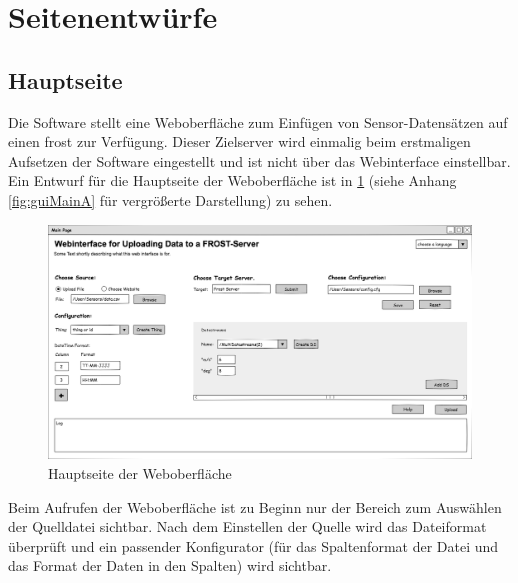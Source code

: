\documentclass[a4paper, 12 pt]{article}
\begin{document}
\section{Seitenentwürfe}

\subsection{Hauptseite}
Die Software stellt eine Weboberfläche zum Einfügen von Sensor-Datensätzen auf einen \gls{frost} zur Verfügung. 
Dieser Zielserver wird einmalig beim erstmaligen Aufsetzen der Software eingestellt und ist nicht über das Webinterface einstellbar. 
Ein Entwurf für die Hauptseite der Weboberfläche ist in \cref{fig:guiMain} (siehe Anhang \cref{fig:guiMainA} für vergrößerte Darstellung) zu sehen.
\\

\begin{figure}[htbp]
\centering
\includegraphics[scale=0.4]{images/gui}
\caption{\label{fig:guiMain}Hauptseite der Weboberfläche}
\end{figure}
Beim Aufrufen der Weboberfläche ist zu Beginn nur der Bereich zum Auswählen der Quelldatei sichtbar. 
Nach dem Einstellen der Quelle wird das Dateiformat überprüft und ein passender Konfigurator (für das Spaltenformat der Datei und das Format der Daten in den Spalten) wird sichtbar. \\
\end{document}
